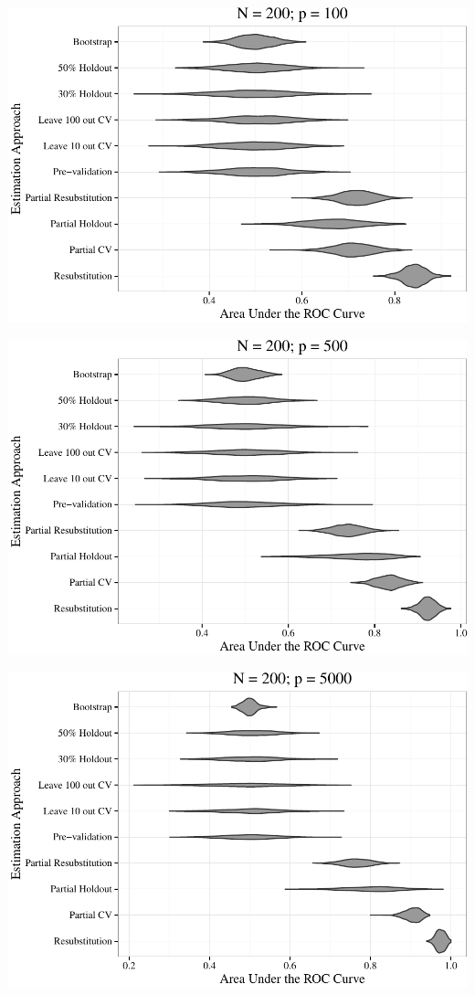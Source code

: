 \documentclass[11pt,]{article}
\begin{document}
\includegraphics{supplement_files/figure-latex/plotsauc-5.pdf}
\clearpage

\includegraphics{supplement_files/figure-latex/plotsauc-6.pdf}
\clearpage

\includegraphics{supplement_files/figure-latex/plotsauc-7.pdf}
\clearpage
\end{document}
